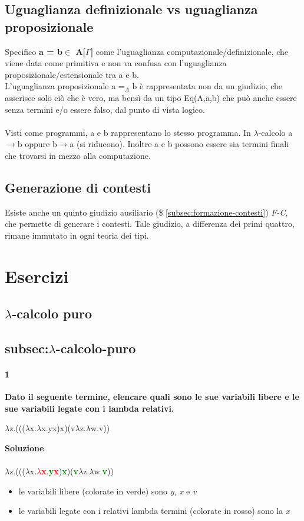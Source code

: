 \documentclass[10pt,a4paper, italian]{book}
\begin{document}
\subsection{Uguaglianza definizionale vs uguaglianza proposizionale}
\label{subsec:uguaglianza-computazionale-proposizionale}
Specifico \textbf{a = b$\in$ A[$\Gamma$]} come l'uguaglianza computazionale/definizionale, che viene data come primitiva e non va confusa con l'uguaglianza proposizionale/estensionale tra a e b.\\L'uguaglianza proposizionale a =$_A$ b \`e rappresentata non da un giudizio, che asserisce solo ci\`o che \`e vero, ma bens\`i da un tipo Eq(A,a,b) che pu\`o anche essere senza termini e/o essere falso, dal punto di vista logico.\\\\
Visti come programmi, a e b rappresentano lo stesso programma. In $\lambda$-calcolo a$\rightarrow$b oppure b$\rightarrow$a (si riducono). Inoltre a e b possono essere sia termini finali che trovarsi in mezzo alla computazione.
\subsection{Generazione di contesti}
\label{subsec:generazione-di-contesti}
Esiste anche un quinto giudizio ausiliario (\$ \ref{subsec:formazione-contesti}) \textit{F-C}, che permette di generare i contesti. Tale giudizio, a differenza dei primi quattro, rimane immutato in ogni teoria dei tipi.

\section{Esercizi}
\subsection{$\lambda$-calcolo puro}
\subsection{subsec:$\lambda$-calcolo-puro}
\paragraph{1} 
\textbf{Dato il seguente termine, elencare quali sono le sue variabili libere e le sue variabili legate con i lambda relativi.}
\begin{center}$\lambda$z.((($\lambda$x.$\lambda$x.yx)x)(v$\lambda$z.$\lambda$w.v))\end{center}
\textbf{Soluzione}\\\\
$\lambda$z.((($\lambda$x.\textbf{\textcolor{red}{$\lambda$x}}.\textbf{\textcolor{green}{y}\textcolor{red}{x}})\textbf{\textcolor{green}{x}})(\textbf{\textcolor{green}{v}}$\lambda$z.$\lambda$w.\textbf{\textcolor{green}{v}}))
\begin{itemize}
\item le variabili libere (colorate in verde) sono \textit{y, x} e \textit{v}
\item le variabili legate con i relativi lambda termini (colorate in rosso) sono la \textit{x}
\end{itemize}
\end{document}
